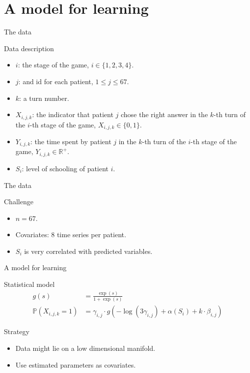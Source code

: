 \documentclass[10pt]{beamer}
\def\P{{\mathbb P}}
\begin{document}
\section{A model for learning}

\begin{frame}{The data}
 \begin{exampleblock}{Data description}
  \begin{itemize} 
   \item $i$: the stage of the game, $i \in \{1,2,3,4\}$.
	 \item $j$: and id for each patient, $1 \leq j \leq 67$.
	 \item $k$: a turn number.
	 \item $X_{i,j,k}$: the indicator that patient $j$
	 chose the right answer in the $k$-th turn of
	 the $i$-th stage of the game,
	 $X_{i,j,k} \in \{0,1\}$.
	 \item $Y_{i,j,k}$: the time spent by patient $j$
	 in the $k$-th turn of the $i$-th stage of the game,
	 $Y_{i,j,k} \in \mathbb{R}^+$.
	 \item $S_{i}$: level of schooling of patient $i$.
  \end{itemize}
 \end{exampleblock}
\end{frame}

\begin{frame}{The data}
 \begin{alertblock}{Challenge}
  \begin{itemize}
   \item $n=67$.
	 \item Covariates: $8$ time series per patient.
	 \item $S_{i}$ is very correlated with predicted variables.
	\end{itemize}
 \end{alertblock}
\end{frame}

\begin{frame}{A model for learning}
 \begin{exampleblock}{Statistical model}
  \begin{align*}
	 g(s) 
	 &= \frac{\exp(s)}{1+\exp(s)} \\
	 \P(X_{i,j,k}=1)
	 &= \gamma_{i,j} \cdot g(-\log(3\gamma_{i,j})+\alpha(S_{i})+k \cdot \beta_{i,j})
	\end{align*}
 \end{exampleblock}
 \begin{alertblock}{Strategy}
  \begin{itemize}
   \item Data might lie on a low dimensional manifold.
	 \item Use estimated parameters as covariates.
	\end{itemize}
 \end{alertblock}
\end{frame}
\end{document}
